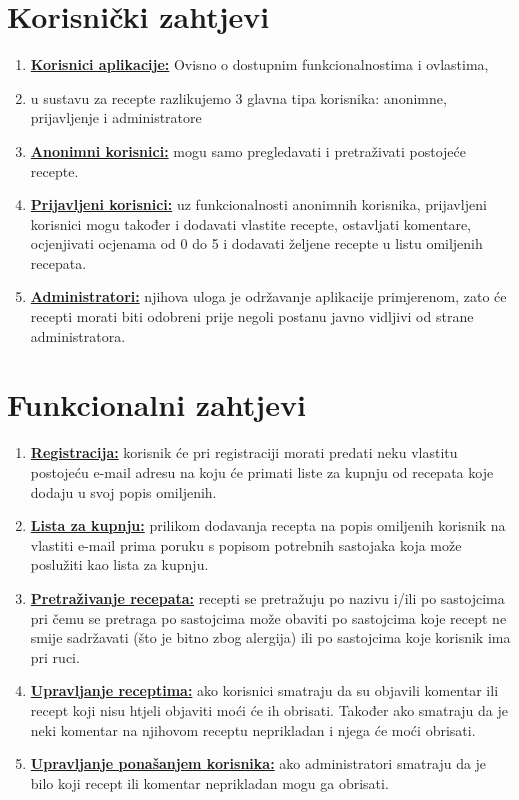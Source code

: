 \documentclass[times, utf8, zavrsni]{fer}
\begin{document}
\section{Korisnički zahtjevi}
\begin{enumerate}
      \item \textbf{\underline{Korisnici aplikacije:}} Ovisno o dostupnim funkcionalnostima i ovlastima,
      \item u sustavu za recepte razlikujemo 3 glavna tipa korisnika: anonimne, prijavljenje i administratore
      \item \textbf{\underline{Anonimni korisnici:}} mogu samo pregledavati i pretraživati
            postojeće recepte.
      \item \textbf{\underline{Prijavljeni korisnici:}} uz funkcionalnosti
            anonimnih korisnika, prijavljeni korisnici mogu također i dodavati vlastite recepte, ostavljati komentare,
            ocjenjivati ocjenama od 0 do 5 i dodavati željene recepte u listu omiljenih recepata.
      \item \textbf{\underline{Administratori:}} njihova uloga je održavanje
            aplikacije primjerenom, zato će recepti morati biti odobreni prije negoli postanu javno vidljivi
             od strane administratora.
\end{enumerate}

\section{Funkcionalni zahtjevi}
\begin{enumerate}
      \item \textbf{\underline{Registracija:}} korisnik će pri registraciji morati predati neku vlastitu
            postojeću e-mail adresu na koju će primati liste za kupnju od recepata koje dodaju u svoj popis omiljenih.
      \item \textbf{\underline{Lista za kupnju:}} prilikom dodavanja recepta na popis omiljenih
            korisnik na vlastiti e-mail prima poruku s popisom potrebnih sastojaka koja
            može poslužiti kao lista za kupnju.
      \item \textbf{\underline{Pretraživanje recepata:}} recepti se pretražuju po nazivu i/ili po sastojcima pri čemu se pretraga po
            sastojcima može obaviti po sastojcima koje recept ne smije sadržavati (što je bitno zbog
            alergija) ili po sastojcima koje korisnik ima pri ruci.
      \item \textbf{\underline{Upravljanje receptima:}} ako korisnici smatraju da su objavili komentar ili recept
            koji nisu htjeli objaviti moći će ih obrisati. Također ako smatraju da je neki komentar na njihovom receptu
            neprikladan i njega će moći obrisati.
      \item \textbf{\underline{Upravljanje ponašanjem korisnika:}} ako administratori smatraju da je bilo koji
            recept ili komentar neprikladan mogu ga obrisati.
\end{enumerate}
\end{document}
